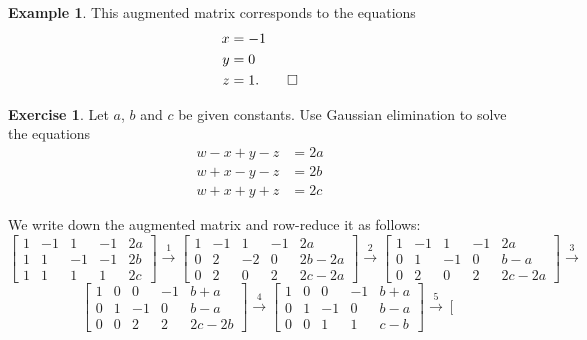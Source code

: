 \documentclass[a4paper]{book}
\newcommand{\xra}       {\xrightarrow}
\renewcommand{\:}{\colon}
\theoremstyle{definition}
\newtheorem{example}[theorem]{Example}
\newtheorem{exercise}[theorem]{Exercise}
\renewenvironment{solution}{\SolutionInline}{\endSolutionInline}
\begin{document}
\begin{example}
 This augmented matrix corresponds to the equations
 \begin{align*}
  x &= -1 \\
  y &= 0 \\
  z &= 1. \qed
 \end{align*}
\end{example}

\begin{exercise}
 Let $a$, $b$ and $c$ be given constants.  Use Gaussian elimination to
 solve the equations 
 \begin{align*}
  w-x+y-z &= 2a \\
  w+x-y-z &= 2b \\
  w+x+y+z &= 2c
 \end{align*}
\end{exercise}
\begin{solution}
 We write down the augmented matrix and row-reduce it as follows:
 {\small \[
  \left[\begin{array}{cccc|c}
    1 & -1 &  1 & -1 & 2a \\
    1 &  1 & -1 & -1 & 2b \\
    1 &  1 &  1 &  1 & 2c
  \end{array}\right]
  \xra{1}
  \left[\begin{array}{cccc|c}
    1 & -1 &  1 & -1 & 2a \\
    0 &  2 & -2 &  0 & 2b-2a \\
    0 &  2 &  0 &  2 & 2c-2a
  \end{array}\right]
  \xra{2}
  \left[\begin{array}{cccc|c}
    1 & -1 &  1 & -1 & 2a \\
    0 &  1 & -1 &  0 & b-a \\
    0 &  2 &  0 &  2 & 2c-2a
  \end{array}\right]
  \xra{3}
 \] \[ \hspace{2em}
  \left[\begin{array}{cccc|c}
    1 &  0 &  0 & -1 & b+a \\
    0 &  1 & -1 &  0 & b-a \\
    0 &  0 &  2 &  2 & 2c-2b
  \end{array}\right]
  \xra{4}
  \left[\begin{array}{cccc|c}
    1 &  0 &  0 & -1 & b+a \\
    0 &  1 & -1 &  0 & b-a \\
    0 &  0 &  1 &  1 & c-b
  \end{array}\right]
  \xra{5}
  \left[\begin{array}{cccc|c}

\end{array}\]}
\end{solution}
\end{document}
